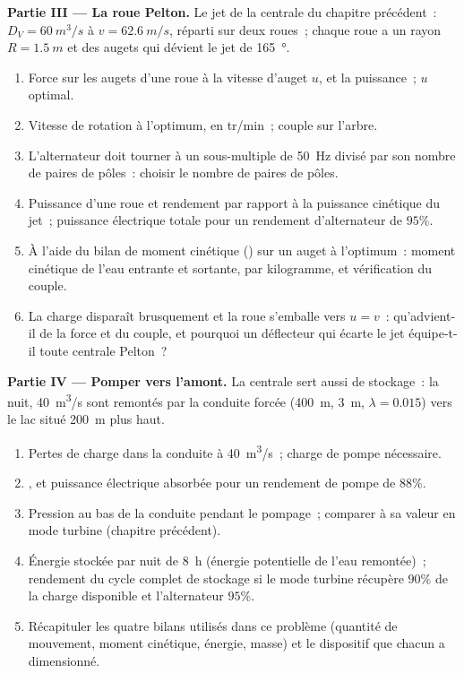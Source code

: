 \begin{problem}
\medskip
\noindent\textbf{Partie III --- La roue Pelton.}
Le jet de la centrale du chapitre précédent~: $D_V = \qty{60}{m^3/s}$ à $v =
\qty{62.6}{m/s}$, réparti sur deux roues~; chaque roue a un rayon $R =
\qty{1.5}{m}$ et des augets qui dévient le jet de \qty{165}{\degree}.
\begin{enumerate}[resume]
  \item Force sur les augets d'une roue à la vitesse d'auget $u$, et la
        puissance~; $u$ optimal.
  \item Vitesse de rotation à l'optimum, en tr/min~; couple sur l'arbre.
  \item L'alternateur doit tourner à un sous-multiple de \qty{50}{Hz} divisé par
        son nombre de paires de pôles~: choisir le nombre de paires de pôles.
  \item Puissance d'une roue et rendement par rapport à la puissance
        cinétique du jet~; puissance électrique totale pour un rendement
        d'alternateur de $95\%$.
  \item À l'aide du bilan de moment cinétique ()
        sur un auget à l'optimum~: moment cinétique de l'eau
        entrante et sortante, par kilogramme, et vérification du couple.
  \item La charge disparaît brusquement et la roue s'emballe vers $u =
        v$~: qu'advient-il de la force et du couple, et pourquoi un
        déflecteur qui écarte le jet équipe-t-il toute centrale Pelton~?
\end{enumerate}

\medskip
\noindent\textbf{Partie IV --- Pomper vers l'amont.}
La centrale sert aussi de stockage~: la nuit, \qty{40}{m^3/s} sont remontés
par la conduite forcée (\qty{400}{m}, \qty{3}{m}, $\lambda = 0.015$) vers le
lac situé \qty{200}{m} plus haut.
\begin{enumerate}[resume]
  \item Pertes de charge dans la conduite à \qty{40}{m^3/s}~; charge de pompe nécessaire.
  \item {}, et puissance électrique absorbée pour un rendement de pompe
        de $88\%$.
  \item Pression au bas de la conduite pendant le pompage~; comparer
        à sa valeur en mode turbine (chapitre précédent).
  \item Énergie stockée par nuit de \qty{8}{h} (énergie potentielle de l'eau
        remontée)~; rendement du cycle complet de stockage si le
        mode turbine récupère $90\%$ de la charge disponible et
        l'alternateur $95\%$.
  \item Récapituler les quatre bilans utilisés dans ce problème (quantité de mouvement, moment
        cinétique, énergie, masse) et le dispositif que chacun a dimensionné.
\end{enumerate}
\end{problem}
